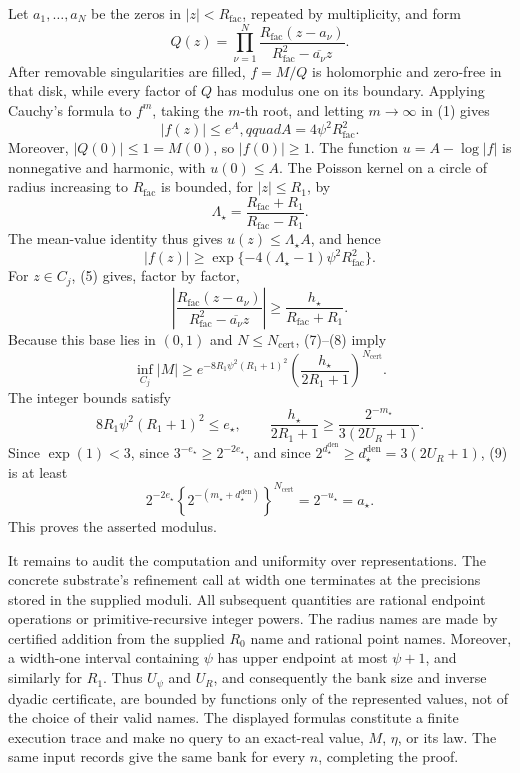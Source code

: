 Let \(a_1,\ldots,a_N\) be the zeros in \(|z|<R_{\mathrm{fac}}\), repeated by multiplicity, and form
\[
 Q(z)=\prod_{\nu=1}^N
 \frac{R_{\mathrm{fac}}(z-a_\nu)}
      {R_{\mathrm{fac}}^2-\overline{a_\nu}z}.
\]
After removable singularities are filled, \(f=M/Q\) is holomorphic and zero-free in that disk, while every factor of \(Q\) has modulus one on its boundary.  Applying Cauchy's formula to \(f^m\), taking the \(m\)-th root, and letting \(m\to\infty\) in (1) gives
\[
 |f(z)|\le e^A,qquad A=4\psi^2R_{\mathrm{fac}}^2. \tag{6}
\]
Moreover, \(|Q(0)|\le1=M(0)\), so \(|f(0)|\ge1\).  The function \(u=A-\log|f|\) is nonnegative and harmonic, with \(u(0)\le A\).  The Poisson kernel on a circle of radius increasing to \(R_{\mathrm{fac}}\) is bounded, for \(|z|\le R_1\), by
\[
 \Lambda_{\star}
 =\frac{R_{\mathrm{fac}}+R_1}{R_{\mathrm{fac}}-R_1}.
\]
The mean-value identity thus gives \(u(z)\le\Lambda_{\star}A\), and hence
\[
 |f(z)|\ge
 \exp\{-4(\Lambda_{\star}-1)\psi^2R_{\mathrm{fac}}^2\}. \tag{7}
\]
For \(z\in C_j\), (5) gives, factor by factor,
\[
 \left|
 \frac{R_{\mathrm{fac}}(z-a_\nu)}
      {R_{\mathrm{fac}}^2-\overline{a_\nu}z}
 \right|
 \ge\frac{h_{\star}}{R_{\mathrm{fac}}+R_1}. \tag{8}
\]
Because this base lies in \((0,1)\) and \(N\le N_{\mathrm{cert}}\), (7)--(8) imply
\[
 \inf_{C_j}|M|
 \ge e^{-8R_1\psi^2(R_1+1)^2}
 \left(\frac{h_{\star}}{2R_1+1}\right)^{N_{\mathrm{cert}}}. \tag{9}
\]
The integer bounds satisfy
\[
 8R_1\psi^2(R_1+1)^2\le e_{\star},
 \qquad
 \frac{h_{\star}}{2R_1+1}
 \ge\frac{2^{-m_{\star}}}{3(2U_R+1)}.
\]
Since \(\exp(1)<3\), since \(3^{-e_{\star}}\ge2^{-2e_{\star}}\), and since \(2^{d_{\star}^{\mathrm{den}}}\ge d_{\star}^{\mathrm{den}}=3(2U_R+1)\), (9) is at least
\[
 2^{-2e_{\star}}
 \left\{2^{-(m_{\star}+d_{\star}^{\mathrm{den}})}\right\}^{N_{\mathrm{cert}}}
 =2^{-u_{\star}}=a_{\star}. \tag{10}
\]
This proves the asserted modulus.

It remains to audit the computation and uniformity over representations.  The concrete substrate's refinement call at width one terminates at the precisions stored in the supplied moduli.  All subsequent quantities are rational endpoint operations or primitive-recursive integer powers.  The radius names are made by certified addition from the supplied \(R_0\) name and rational point names.  Moreover, a width-one interval containing \(\psi\) has upper endpoint at most \(\psi+1\), and similarly for \(R_1\).  Thus \(U_{\psi}\) and \(U_R\), and consequently the bank size and inverse dyadic certificate, are bounded by functions only of the represented values, not of the choice of their valid names.  The displayed formulas constitute a finite execution trace and make no query to an exact-real value, \(M\), \(\eta\), or its law.  The same input records give the same bank for every \(n\), completing the proof.